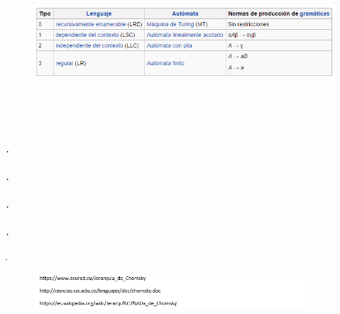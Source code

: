 \documentclass[a4paper,12pt]{letter}%
\begin{document}
\begin{letter}
\begin{enumerate}
\end{enumerate}

\begin{center}
\begin{figure}
\includegraphics[width=1\textwidth]{malditajerarquia.png} 
\centering
\end{figure}
\end{center}

\begin{lstlisting}

\end{lstlisting}
\begin{lstlisting}

\end{lstlisting}
\begin{lstlisting}

\end{lstlisting}
\begin{lstlisting}

\end{lstlisting}
\begin{lstlisting}

\end{lstlisting}
\begin{lstlisting}
.

.

.

.
\end{lstlisting}

.
\closing{   } \vspace{5mm}%
\begin{center}
\begin{figure}
\includegraphics[width=0.9\textwidth]{tochebibliografia.png} 
\centering
\end{figure}
\end{center}

\end{letter}
\end{document}
